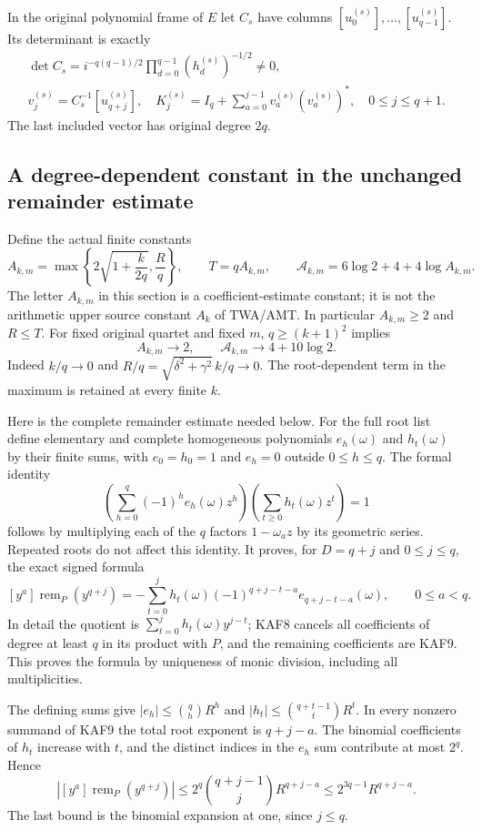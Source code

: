 \documentclass[11pt,a4paper]{article}
\begin{document}
In the original polynomial frame of $E$ let $C_s$ have columns
$[u_0^{(s)}],\ldots,[u_{q-1}^{(s)}]$. Its determinant is exactly
\[
\begin{gathered}
 \det C_s=i^{-q(q-1)/2}\prod_{d=0}^{q-1}(h_d^{(s)})^{-1/2}\ne0,
 \\ v_j^{(s)}=C_s^{-1}[u_{q+j}^{(s)}],\quad
 K_j^{(s)}=I_q+\sum_{a=0}^{j-1}v_a^{(s)}(v_a^{(s)})^*,
 \quad0\le j\le q+1.
\end{gathered}\tag{KAF5}
\]
The last included vector has original degree $2q$.

\subsection{A degree-dependent constant in the unchanged remainder estimate}
Define the actual finite constants
\[
 A_{k,m}=\max\left\{2\sqrt{1+\frac{k}{2q}},\frac{R}{q}\right\},
 \qquad T=qA_{k,m},\qquad
 \mathcal A_{k,m}=6\log2+4+4\log A_{k,m}.
 \tag{KAF6}
\]
The letter $A_{k,m}$ in this section is a coefficient-estimate constant;
it is not the arithmetic upper source constant $A_k$ of TWA/AMT.
In particular $A_{k,m}\ge2$ and $R\le T$. For fixed original quartet
and fixed $m$, $q\ge(k+1)^2$ implies
\[
 A_{k,m}\longrightarrow2,\qquad
 \mathcal A_{k,m}\longrightarrow4+10\log2.
 \tag{KAF7}
\]
Indeed $k/q\to0$ and $R/q=\sqrt{\delta^2+\gamma^2}\,k/q\to0$.
The root-dependent term in the maximum is retained at every finite $k$.

Here is the complete remainder estimate needed below. For the full
root list define elementary and complete homogeneous polynomials
$e_h(\omega)$ and $h_t(\omega)$ by their finite sums, with
$e_0=h_0=1$ and $e_h=0$ outside $0\le h\le q$. The formal identity
\[
 \left(\sum_{h=0}^q(-1)^he_h(\omega)z^h\right)
 \left(\sum_{t\ge0}h_t(\omega)z^t\right)=1
 \tag{KAF8}
\]
follows by multiplying each of the $q$ factors $1-\omega_a z$
by its geometric series. Repeated roots do not affect this identity.
It proves, for $D=q+j$ and $0\le j\le q$, the exact signed formula
\[
 [y^a]\operatorname{rem}_P(y^{q+j})
 =-\sum_{t=0}^j h_t(\omega)(-1)^{q+j-t-a}e_{q+j-t-a}(\omega),
 \qquad0\le a<q.\tag{KAF9}
\]
In detail the quotient is $\sum_{t=0}^jh_t(\omega)y^{j-t}$;
KAF8 cancels all coefficients of degree at least $q$ in its product
with $P$, and the remaining coefficients are KAF9. This proves the
formula by uniqueness of monic division, including all multiplicities.

The defining sums give
$|e_h|\le\binom qh R^h$ and
$|h_t|\le\binom{q+t-1}{t}R^t$. In every nonzero summand of KAF9
the total root exponent is $q+j-a$. The binomial coefficients of
$h_t$ increase with $t$, and the distinct indices in the $e_h$ sum
contribute at most $2^q$. Hence
\[
 |[y^a]\operatorname{rem}_P(y^{q+j})|
 \le2^q\binom{q+j-1}{j}R^{q+j-a}
 \le2^{3q-1}R^{q+j-a}.\tag{KAF10}
\]
The last bound is the binomial expansion at one, since $j\le q$.
\end{document}
